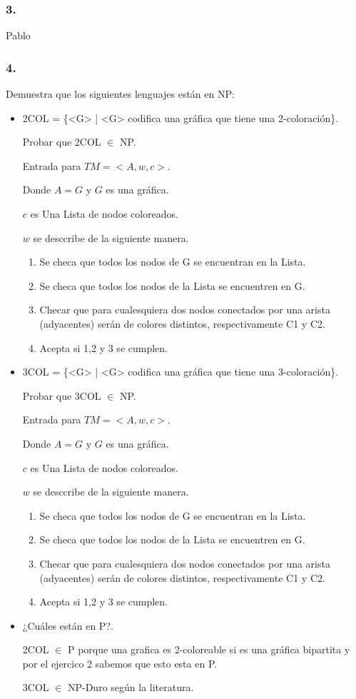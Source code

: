 \documentclass[12pt]{article}
\begin{document}
\subsubsection*{3.}
Pablo
\subsubsection*{4.}

Demuestra que los siguientes lenguajes están en NP:

 \begin{itemize}
  \item 2COL = \{<G> | <G> codifica una gráfica que tiene una 2-coloración\}.
  
  Probar que 2COL $\in$ NP.

  Entrada para $TM = <A,w,c>$.
  
Donde $A = G$ y $G$ es una gráfica.

$c$ es Una Lista de nodos coloreados.

$w$ se desccribe de la siguiente manera.

\begin{enumerate}
 \item Se checa que todos los nodos de G se encuentran en la Lista.
 \item Se checa que todos los nodos de la Lista se encuentren en G.
 \item Checar que para cualesquiera dos nodos conectados por una arista (adyacentes) serán de colores distintos, respectivamente C1 y C2.
 \item Acepta si 1,2 y 3 se cumplen.
\end{enumerate}

  \item 3COL = \{<G> | <G> codifica una gráfica que tiene una 3-coloración\}.
  
  Probar que 3COL $\in$ NP.

  Entrada para $TM = <A,w,c>$.
  
Donde $A = G$ y $G$ es una gráfica.

$c$ es Una Lista de nodos coloreados.

$w$ se desccribe de la siguiente manera.

\begin{enumerate}
 \item Se checa que todos los nodos de G se encuentran en la Lista.
 \item Se checa que todos los nodos de la Lista se encuentren en G.
 \item Checar que para cualesquiera dos nodos conectados por una arista (adyacentes) serán de colores distintos, respectivamente C1 y C2.
 \item Acepta si 1,2 y 3 se cumplen.
\end{enumerate}

  \item  ¿Cuáles están en P?.
  
  2COL $\in$ P porque una grafica es 2-coloreable si es una gráfica bipartita y por el ejercico 2 sabemos que esto esta en P.
  
  3COL $\in$ NP-Duro según la literatura.


 \end{itemize}
\end{document}
